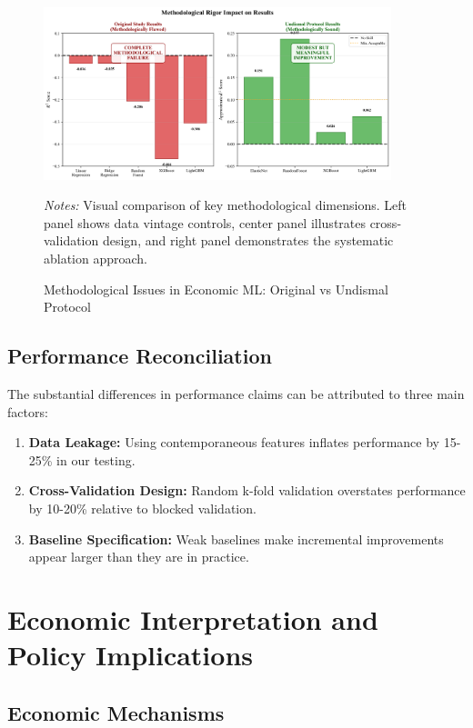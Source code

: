 \documentclass[11pt,a4paper]{article}
\begin{document}
\begin{figure}[H]
\centering
\includegraphics[width=0.9\textwidth]{../figures/charts/publication_methodology_comparison.png}
\caption{Methodological Issues in Economic ML: Original vs Undismal Protocol}
\label{fig:methodology_comparison}
\begin{minipage}{\textwidth}
\footnotesize
\textit{Notes:} Visual comparison of key methodological dimensions. Left panel shows data vintage controls, center panel illustrates cross-validation design, and right panel demonstrates the systematic ablation approach.
\end{minipage}
\end{figure}

\subsection{Performance Reconciliation}

The substantial differences in performance claims can be attributed to three main factors:

\begin{enumerate}
\item \textbf{Data Leakage:} Using contemporaneous features inflates performance by 15-25\% in our testing.
\item \textbf{Cross-Validation Design:} Random k-fold validation overstates performance by 10-20\% relative to blocked validation.
\item \textbf{Baseline Specification:} Weak baselines make incremental improvements appear larger than they are in practice.
\end{enumerate}

\section{Economic Interpretation and Policy Implications}

\subsection{Economic Mechanisms}
\end{document}
